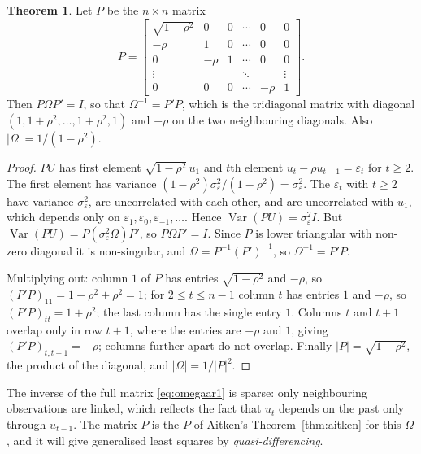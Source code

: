 \documentclass[11pt,a4paper]{article}
\numberwithin{equation}{section}
\DeclareMathOperator{\Var}{Var}
\theoremstyle{definition}
\newtheorem{thm}{Theorem}[subsection]
\begin{document}
\begin{thm}
\label{thm:ar1omega}
Let $P$ be the $n \times n$ matrix
\[
P = \begin{bmatrix}
\sqrt{1 - \rho^2} & 0 & 0 & \cdots & 0 & 0\\
-\rho & 1 & 0 & \cdots & 0 & 0\\
0 & -\rho & 1 & \cdots & 0 & 0\\
\vdots & & & \ddots & & \vdots\\
0 & 0 & 0 & \cdots & -\rho & 1
\end{bmatrix} .
\]
Then $P\Omega P' = I$, so that $\Omega^{-1} = P'P$, which is the tridiagonal matrix with diagonal $(1, 1 + \rho^2, \dots, 1 + \rho^2, 1)$ and $-\rho$ on the two
neighbouring diagonals. Also $|\Omega| = 1/(1 - \rho^2)$.
\end{thm}

\begin{proof}
$PU$ has first element $\sqrt{1 - \rho^2}\,u_1$ and $t$th element $u_t - \rho u_{t-1} = \varepsilon_t$ for $t \geq 2$. The first element has variance
$(1 - \rho^2)\sigma_\varepsilon^2/(1 - \rho^2) = \sigma_\varepsilon^2$. The $\varepsilon_t$ with $t \geq 2$ have variance $\sigma_\varepsilon^2$, are uncorrelated with each other, and are uncorrelated
with $u_1$, which depends only on $\varepsilon_1, \varepsilon_0, \varepsilon_{-1}, \dots$. Hence $\Var(PU) = \sigma_\varepsilon^2I$. But $\Var(PU) = P(\sigma_\varepsilon^2\Omega)P'$, so $P\Omega P' = I$. Since $P$ is
lower triangular with non-zero diagonal it is non-singular, and $\Omega = P^{-1}(P')^{-1}$, so $\Omega^{-1} = P'P$.

Multiplying out: column $1$ of $P$ has entries $\sqrt{1 - \rho^2}$ and $-\rho$, so $(P'P)_{11} = 1 - \rho^2 + \rho^2 = 1$; for $2 \leq t \leq n - 1$ column $t$ has entries $1$
and $-\rho$, so $(P'P)_{tt} = 1 + \rho^2$; the last column has the single entry $1$. Columns $t$ and $t + 1$ overlap only in row $t + 1$, where the entries
are $-\rho$ and $1$, giving $(P'P)_{t,t+1} = -\rho$; columns further apart do not overlap. Finally $|P| = \sqrt{1 - \rho^2}$, the product of the diagonal, and
$|\Omega| = 1/|P|^2$.
\end{proof}

The inverse of the full matrix \eqref{eq:omegaar1} is sparse: only neighbouring observations are linked, which reflects the fact that $u_t$ depends on the
past only through $u_{t-1}$. The matrix $P$ is the $P$ of Aitken's Theorem~\ref{thm:aitken} for this $\Omega$, and it will give generalised least squares by
\emph{quasi-differencing}.
\end{document}
